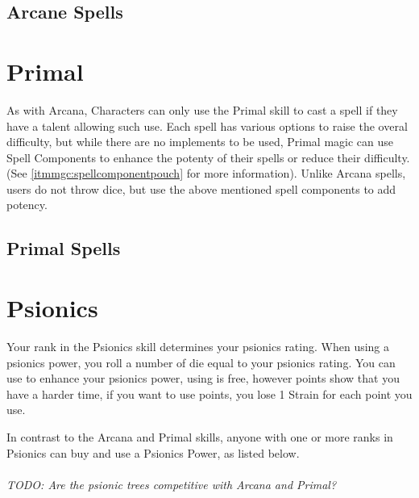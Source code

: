 \begin{multicols}{2}
\subsection{Arcane Spells}





%
\end{multicols}

\FloatBarrier
\hrulefill

\begin{multicols}{2}

\section{Primal}

As with Arcana, Characters can only use the Primal skill to cast a spell if they
have a talent allowing such use. Each spell has various options to raise the overal
difficulty, but while there are no implements to be used, Primal magic can use Spell
Components to enhance the potenty of their spells or reduce their difficulty.
(See \cref{itmmgc:spellcomponentpouch} for more information). Unlike Arcana spells,
users do not throw \force dice, but use the above mentioned spell components to add potency.

\subsection{Primal Spells}





\FloatBarrier

\section{Psionics}
Your rank in the Psionics skill determines your psionics rating.
When using a psionics power, you roll a number of \force die equal to your
psionics rating. You can use \darklight to enhance your psionics power,
using \light is free, however \dark points show that you have a harder time,
if you want to use \dark points, you lose 1 Strain for each \dark point you
use.

In contrast to the Arcana and Primal skills, anyone with one or more ranks
in Psionics can buy and use a Psionics Power, as listed below.\\
\\
\textit{TODO: Are the psionic trees competitive with Arcana and Primal?}

\end{multicols}
\newpage






